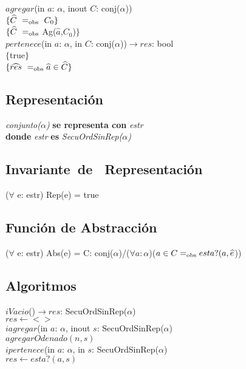 $agregar$(in $a$: $\alpha$, inout $C$: conj($\alpha$))\\
$\{\widehat{C}\ =_{\mathrm{obs}}\ C_0\}$\\
$\{\widehat{C}\ =_{\mathrm{obs}}$ Ag($\widehat{a}$,$C_0$)$\}$\\

$pertenece$(in $a$: $\alpha$, in $C$: conj($\alpha$))$\longrightarrow res$: bool\\
$\{$true$\}$\\
$\{\widehat{res}\ =_{\mathrm{obs}} \widehat{a}\in \widehat{C}\}$\\

\subsection*{Representaci\'on}
\textit{conjunto($\alpha$)} \textbf{se representa con} \textit{estr}\\
\textbf{donde} \textit{estr} \textbf{es} \textit{SecuOrdSinRep($\alpha$)}\\

\subsection*{Invariante\ de \ Representaci\'on}
\vspace{11pt}
($\forall$ e: estr) Rep(e) = true
\vspace{33pt}

\subsection*{Funci\'on de Abstracci\'on}
\vspace{11pt}
($\forall$ e: estr) Abs(e) = C: conj($\alpha$)/($\forall a:\alpha$)($a\in C=_{\mathrm{obs}} esta?(a,\widehat{e}$))
\vspace{33pt}


\subsection*{Algoritmos}

$iVacio$()$\longrightarrow res$: SecuOrdSinRep($\alpha$)\\
$res\longleftarrow <>$\\

$iagregar$(in $a$: $\alpha$, inout $s$: SecuOrdSinRep($\alpha$)\\
$agregarOdenado(n,s)$\\

$ipertenece$(in $a$: $\alpha$, in $s$: SecuOrdSinRep($\alpha$)\\
$res\longleftarrow esta?(a,s)$\\